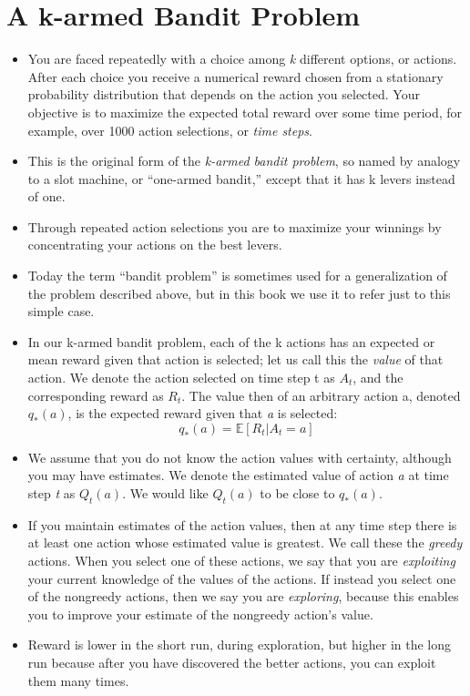 \documentclass{article}
\begin{document}
\section{A k-armed Bandit Problem}
\begin{itemize}
    \item You are faced repeatedly with a choice among \emph{k} different options, or actions. After each choice you receive a numerical reward chosen from a stationary probability distribution that depends on the action you selected. Your objective is to maximize the expected total reward over some time period, for example, over 1000 action selections, or \emph{time steps}.
    \item This is the original form of the \emph{k-armed bandit problem}, so named by analogy to a slot machine, or “one-armed bandit,” except that it has k levers instead of one.
    \item Through repeated action selections you are to maximize your winnings by concentrating your actions on the best levers.
    \item Today the term “bandit problem” is sometimes used for a generalization of the problem described above, but in this book we use it to refer just to this simple case.
    \item In our k-armed bandit problem, each of the k actions has an expected or mean reward given that action is selected; let us call this the \emph{value} of that action. We denote the action selected on time step t as $A_t$, and the corresponding reward as $R_t$. The value then of an arbitrary action a, denoted $q_*(a)$, is the expected reward given that \emph{a} is selected: $$ q_*(a) = \mathbb{E}[R_t | A_t = a] $$
    \item We assume that you do not know the action values with certainty, although you may have estimates. We denote the estimated value of action \emph{a} at time step \emph{t} as $Q_t(a)$. We would like $Q_t(a)$ to be close to $q_*(a)$.
    \item If you maintain estimates of the action values, then at any time step there is at least one action whose estimated value is greatest. We call these the \emph{greedy} actions. When you select one of these actions, we say that you are \emph{exploiting} your current knowledge of the values of the actions. If instead you select one of the nongreedy actions, then we say you are \emph{exploring}, because this enables you to improve your estimate of the nongreedy action's value.
    \item Reward is lower in the short run, during exploration, but higher in the long run because after you have discovered the better actions, you can exploit them many times.
\end{itemize}
\end{document}
